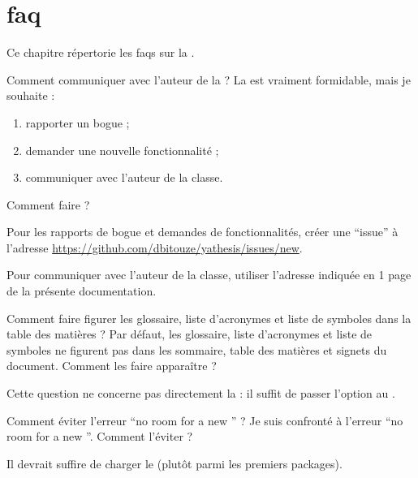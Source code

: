 \chapter{\texorpdfstring{\acrshort{faq}}{FAQ}}\label{cha:faq}

Ce chapitre répertorie les \glspl{faq} sur la \yatcl{}.

\begin{dbfaq}{Comment communiquer avec l'auteur de la \yatcl{} ?}{}
  La \yatcl{} est vraiment formidable, mais je souhaite :
  \begin{enumerate}
  \item rapporter un bogue ;
  \item demander une nouvelle fonctionnalité ;
  \item communiquer avec l'auteur de la classe.
  \end{enumerate}
  Comment faire ?
\end{dbfaq}
  \begin{dbanswer}{}{}
    Pour les rapports de bogue et demandes de fonctionnalités, créer une
    \enquote{issue} à l'adresse
    \url{https://github.com/dbitouze/yathesis/issues/new}.

    Pour communiquer avec l'auteur de la classe, utiliser l'adresse indiquée en
    1\iere{} page de la présente documentation.
  \end{dbanswer}

\begin{dbfaq}{Comment faire figurer les glossaire, liste d'acronymes et liste
    de symboles dans la table des matières ?}{}
  Par défaut, les glossaire, liste d'acronymes et liste de symboles ne figurent
  pas dans les sommaire, table des matières et signets du document. Comment les
  faire apparaître ?
\end{dbfaq}
  \begin{dbanswer}{}{}
    Cette question ne concerne pas directement la \yatcl{} : il suffit de
    passer l'option  au .
  \end{dbanswer}

\begin{dbfaq}{Comment éviter l'erreur \enquote{no room for a new
      \protect{}} ?}{}
  Je suis confronté à l'erreur \enquote{no room for a new
    }. Comment l'éviter ?
\end{dbfaq}
\begin{dbanswer}{}{}
  Il devrait suffire de charger le  (plutôt parmi les
  premiers packages).
\end{dbanswer}

%
\iffalse
\fi

